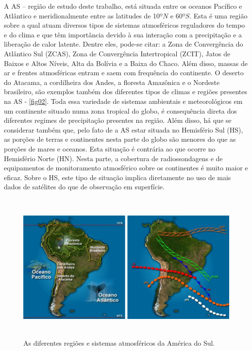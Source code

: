 A AS – região de estudo deste trabalho, está situada entre os oceanos Pacífico e Atlântico e meridionalmente entre as latitudes de 10$ºN$ e 60$ºS$. Esta é uma região sobre a qual atuam diversos tipos de sistemas atmosféricos reguladores do tempo e do clima e que têm importância devido à sua interação com a precipitação e a liberação de calor latente. Dentre eles, pode-se citar: a Zona de Convergência do Atlântico Sul (ZCAS), Zona de Convergência Intertropical (ZCIT), Jatos de Baixos e Altos Níveis, Alta da Bolívia e a Baixa do Chaco. Além disso, massas de ar e frentes atmosféricas entram e saem com frequência do continente. O deserto do Atacama, a cordilheira dos Andes, a floresta Amazônica e o Nordeste brasileiro, são exemplos também dos diferentes tipos de climas e regiões presentes na AS - \autoref{fig02}. Toda essa variedade de sistemas ambientais e meteorológicos em um continente situado numa zona tropical do globo, é consequência direta dos diferentes regimes de precipitação presentes na região. Além disso, há que se considerar também que, pelo fato de a AS estar situada no Hemisfério Sul (HS), as porções de terras e continentes nesta parte do globo são menores do que as porções de mares e oceanos. Esta situação é contrária ao que ocorre no Hemisfério Norte (HN). Nesta parte, a cobertura de radiossondagens e de equipamentos de monitoramento atmosférico sobre os continentes é muito maior e eficaz. Sobre o HS, este tipo de situação implica diretamente no uso de mais dados de satélites do que de observação em superfície.

\begin{figure}[!h]
\centering
\includegraphics[height=7.5cm]{./figs/fig02.png}
\caption{As diferentes regiões e sistemas atmosféricos da América do Sul.}
\label{fig02}
\end{figure}

